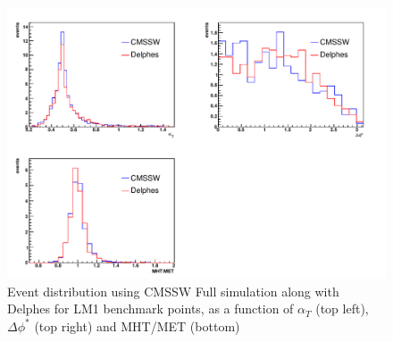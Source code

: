 \begin{figure}[htbp]
\begin{center}
\includegraphics[height=9.cm]{figs/alphat.pdf} 
\caption{Event distribution using CMSSW Full simulation along with Delphes for LM1 benchmark points, 
as a function of $\alpha_{T}$ (top left), $\Delta \phi^{*}$ (top right) and MHT/MET (bottom)}
\label{fig:alphat}
\end{center}
\end{figure}


%	
%	

